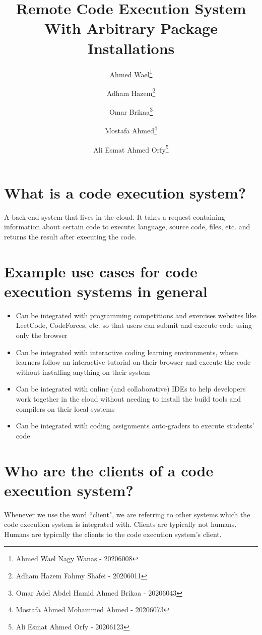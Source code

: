 \documentclass[11pt,a4paper]{article}
\begin{document}
\title{Remote Code Execution System With Arbitrary Package Installations}
\author{
    Ahmed Wael\thanks{Ahmed Wael Nagy Wanas - 20206008}
    \and Adham Hazem\thanks{Adham Hazem Fahmy Shafei - 20206011}
    \and Omar Brikaa\thanks{Omar Adel Abdel Hamid Ahmed Brikaa - 20206043}
    \and Mostafa Ahmed\thanks{Mostafa Ahmed Mohammed Ahmed - 20206073}
    \and Ali Esmat Ahmed Orfy\thanks{Ali Esmat Ahmed Orfy - 20206123}
}
\date{}
\maketitle
\tableofcontents

\section{What is a code execution system?}
A back-end system that lives in the cloud.
It takes a request containing information about certain code to execute: language, source code, files, etc.
and returns the result after executing the code.

\section{Example use cases for code execution systems in general}
\begin{itemize}
    \item Can be integrated with programming competitions and exercises websites like LeetCode, CodeForces, etc.
          so that users can submit and execute code using only the browser
    \item Can be integrated with interactive coding learning \newline environments,
          where learners follow an interactive tutorial on their browser and execute the code without
          installing anything on their system
    \item Can be integrated with online (and collaborative) IDEs to help developers work together in the cloud
          without needing to install the build tools and compilers on their local systems
    \item Can be integrated with coding assignments auto-graders to execute students' code
\end{itemize}

\section{\label{clients}Who are the clients of a code execution system?}
Whenever we use the word ``client", we are referring to other systems which the code execution system is integrated with.
Clients are typically not humans. Humans are typically the clients to the code execution system's client.
\end{document}
